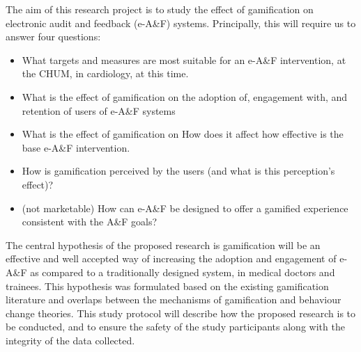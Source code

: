 The aim of this research project is to study the effect of gamification on electronic audit and feedback (e-A\&F) systems. Principally, this will require us to answer four questions:

\begin{itemize}
    \item What targets and measures are most suitable for an e-A\&F intervention, at the CHUM, in cardiology, at this time.
    \item What is the effect of gamification on the adoption of, engagement with, and retention of users of e-A\&F systems
    \item What is the effect of gamification on 
    How does it affect how effective is the base e-A\&F intervention.
    \item How is gamification perceived by the users (and what is this perception's effect)?
    \item (not marketable) How can e-A\&F be designed to offer a gamified experience consistent with the A\&F goals?
\end{itemize}

The central hypothesis of the proposed research is gamification will be an effective and well accepted way of increasing the adoption and engagement of e-A\&F as compared to a traditionally designed system, in medical doctors and trainees. This hypothesis was formulated based on the existing gamification literature and overlaps between the mechanisms of gamification and behaviour change theories. This study protocol will describe how the proposed research is to be conducted, and to ensure the safety of the study participants along with the integrity of the data collected.